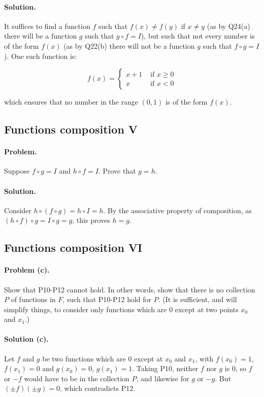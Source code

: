 \documentclass{article}
\begin{document}
\paragraph{Solution.} It suffices to find a function $f$ such that $f(x) \neq f(y)$ if $x \neq y$ (as by Q24(a) there will be a function $g$ such that $g \circ f = I$), but such that not every number is of the form $f(x)$ (as by Q22(b) there will not be a function $g$ such that $f \circ g = I$). One such function is:

\begin{equation*}
  f(x) =
  \begin{cases}
    x + 1 & \text{ if } x \geq 0 \\
    x     & \text{ if } x < 0
  \end{cases}
\end{equation*}

which ensures that no number in the range $(0, 1)$ is of the form $f(x)$.

\setcounter{subsection}{25}
\subsection{Functions composition V}

\paragraph{Problem.} Suppose $f \circ g = I$ and $h \circ f = I$. Prove that $g = h$.

\paragraph{Solution.} Consider $h \circ (f \circ g) = h \circ I = h$. By the associative property of composition, as $(h \circ f) \circ g = I \circ g = g$, this proves $h = g$.

\setcounter{subsection}{26}
\subsection{Functions composition VI}

\paragraph{Problem (c).} Show that P10-P12 cannot hold. In other words, show that there is no collection $P$ of functions in $F$, such that P10-P12 hold for $P$. (It is sufficient, and will simplify things, to consider only functions which are 0 except at two points $x_0$ and $x_1$.)

\paragraph{Solution (c).} Let $f$ and $g$ be two functions which are 0 except at $x_0$ and $x_1$, with $f(x_0) = 1$, $f(x_1) = 0$ and $g(x_0) = 0$, $g(x_1) = 1$. Taking P10, neither $f$ nor $g$ is 0, so $f$ or $-f$ would have to be in the collection $P$, and likewise for $g$ or $-g$. But $(\pm f)(\pm g) = 0$, which contradicts P12.
\end{document}
